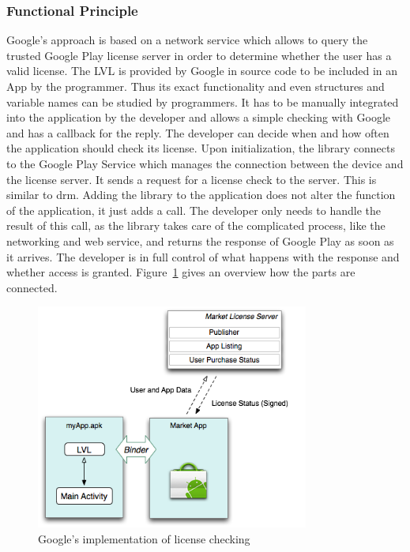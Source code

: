 \subsubsection{Functional Principle} \label{section:license-google-functional}
Google's approach is based on a network service which allows to query the trusted Google Play license server in order to determine whether the user has a valid license.
The LVL is provided by Google in source code to be included in an App by the programmer. Thus its exact functionality and even structures and variable names can be studied by programmers. \cite{munteanLicense}
\newline
It has to be manually integrated into the application by the developer and allows a simple checking with Google and has a callback for the reply.
The developer can decide when and how often the application should check its license.
Upon initialization, the library connects to the Google Play Service which manages the connection between the device and the license server.
It sends a request for a license check to the server.
This is similar to \gls{drm}.
Adding the library to the application does not alter the function of the application, it just adds a call.
The developer only needs to handle the result of this call, as the library takes care of the complicated process, like the networking and web service, and returns the response of Google Play as soon as it arrives.
The developer is in full control of what happens with the response and whether access is granted.
Figure~\ref{fig:lvl} gives an overview how the parts are connected. \cite{digipomLvl} \cite{developersLicensingOverview}
\newline
\begin{figure}[h]
    \centering
    \includegraphics[width=0.8\textwidth]{data/lvl.png}
    \caption{Google's implementation of license checking \cite{developersLicensingOverview}}
    \label{fig:lvl}
\end{figure}
